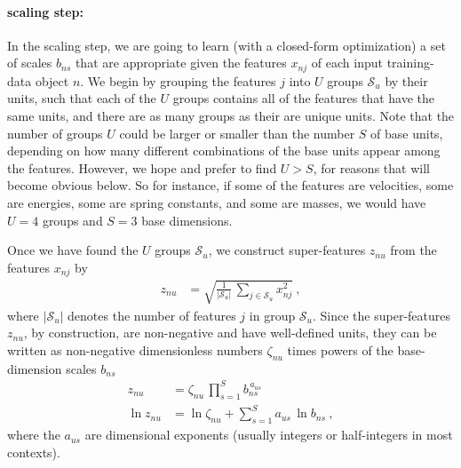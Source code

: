 \documentclass[12pt, letterpaper]{article}
\newcommand{\set}[1]{\mathcal{#1}}
\newcommand{\setS}{\set{S}}
\begin{document}
\paragraph{scaling step:}
In the scaling step, we are going to learn (with a closed-form optimization) a set of scales $b_{ns}$ that are appropriate given the features $x_{nj}$ of each input training-data object $n$.
We begin by grouping the features $j$ into $U$ groups $\setS_u$ by their units, such that each of the $U$ groups contains all of the features that have the same units, and there are as many groups as their are unique units.
Note that the number of groups $U$ could be larger or smaller than the number $S$ of base units, depending on how many different combinations of the base units appear among the features. However, we hope and prefer to find $U>S$, for reasons that will become obvious below.
So for instance, if some of the features are velocities, some are energies, some are spring constants, and some are masses, we would have $U=4$ groups and $S=3$ base dimensions.

Once we have found the $U$ groups $\setS_u$, we construct super-features $z_{nu}$ from the features $x_{nj}$ by
\begin{align}\label{eq:znu}
    z_{nu} &= \sqrt{\frac{1}{|\setS_u|}\,\sum_{j\in\setS_u} x_{nj}^2} ~,
\end{align}
where $|\setS_u|$ denotes the number of features $j$ in group $\setS_u$.
Since the super-features $z_{nu}$, by construction, are non-negative and have well-defined units, they can be written as non-negative dimensionless numbers $\zeta_{nu}$ times powers of the base-dimension scales $b_{ns}$
\begin{align}
    z_{nu} &= \zeta_{nu}\,\prod_{s=1}^S b_{ns}^{\,a_{us}} \\
    \ln z_{nu} &= \ln \zeta_{nu} + \sum_{s=1}^S a_{us}\,\ln b_{ns} ~,
\end{align}
where the $a_{us}$ are dimensional exponents (usually integers or half-integers in most contexts).
\end{document}
